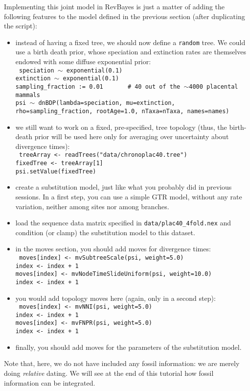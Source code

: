 \documentclass[usletter]{article}
\newcommand{\cmd}[1]{\texttt{#1}}
\begin{document}
Implementing this joint model in RevBayes is just a matter of
adding the following features to the model defined in the previous section
(after duplicating the script):
\begin{itemize}
\item
instead of having a fixed tree, we should now define a \cmd{random} tree. We could use a birth death prior, whose speciation and extinction rates are themselves endowed with some diffuse exponential prior:
\\
\cmd{
speciation $\sim$ exponential(0.1)
\\
extinction $\sim$ exponential(0.1)
\\
sampling\_fraction := 0.01  \, \, \,    \# 40 out of the $\sim$4000 placental mammals
\\
psi $\sim$ dnBDP(lambda=speciation, mu=extinction, rho=sampling\_fraction, rootAge=1.0, nTaxa=nTaxa, names=names)
}
\item
we still want to work on a fixed, pre-specified, tree topology (thus, the birth-death prior will be used here only for averaging over uncertainty about divergence times):
\\
\cmd{
treeArray <- readTrees("data/chronoplac40.tree")
\\
fixedTree <- treeArray[1]
\\
psi.setValue(fixedTree)
}
\item
create a substitution model, just like what you probably did in previous sessions. In a first step, you can use a simple GTR model, without any rate variation, neither among sites nor among branches.
\item
load the sequence data matrix specified in \cmd{data/plac40\_4fold.nex} and condition (or clamp) the substitution model to this dataset.
\item
in the moves section, you should add moves for divergence times:
\\
\cmd{
moves[index] <- mvSubtreeScale(psi, weight=5.0)
\\
index <- index + 1
\\
moves[index] <- mvNodeTimeSlideUniform(psi, weight=10.0)
\\
index <- index + 1
}
\item
you would add topology moves here (again, only in a second step):
\\
\cmd{
moves[index] <- mvNNI(psi, weight=5.0)
\\
index <- index + 1
\\
moves[index] <- mvFNPR(psi, weight=5.0)
\\
index <- index + 1
}
\item
finally, you should add moves for the parameters of the substitution model.
\end{itemize}
Note that, here, we do not have included any fossil information: we are merely doing \emph{relative} dating. We will see at the end of this tutorial how fossil information can be integrated.
\end{document}
